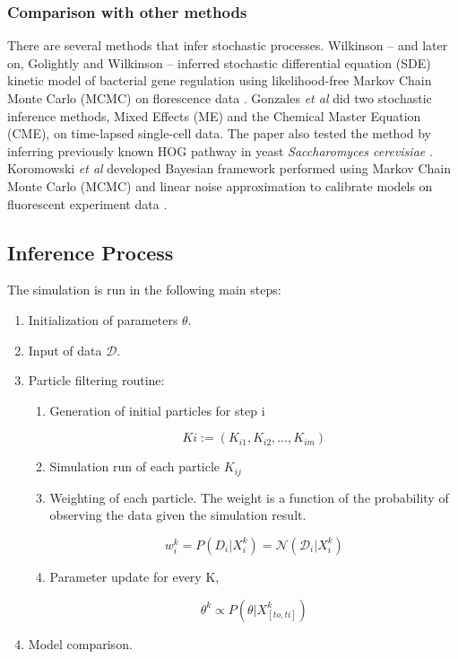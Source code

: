 \documentclass{bioinfo}
\begin{document}
\subsubsection{Comparison with other methods}

There are several methods that infer stochastic processes. Wilkinson -- and later on, Golightly and Wilkinson --  inferred stochastic differential equation (SDE) kinetic model of bacterial gene regulation using likelihood-free Markov Chain Monte Carlo (MCMC) on florescence data \citep{Wilkinson10, GolightlyWilkinson10}. Gonzales \textit{et al} did two stochastic inference methods, Mixed Effects (ME) and the Chemical Master Equation (CME), on time-lapsed single-cell data. The paper also tested the method by inferring previously known HOG pathway in yeast \textit{Saccharomyces cerevisiae} \citep{Gonzales13}. Koromowski \textit{et al} developed Bayesian framework performed using Markov Chain Monte Carlo (MCMC) and linear noise approximation to calibrate models on fluorescent experiment data \citep{Komorowski09}.


\subsection{Inference Process}

The simulation is run in the following main steps:

\begin{enumerate}
\item Initialization of parameters $\theta$.
\item Input of data $\mathcal{D}$.
\item Particle filtering routine:

\begin{enumerate}
\item Generation of initial particles for step i

\begin{equation}
Ki := (K_{i1}, K_{i2}, \dots, K_{im})\label{eq:11}
\end{equation}

\item Simulation run of each particle $K_{ij}$
\item Weighting of each particle. The weight is a function of the probability of observing the data given the simulation result.

\begin{equation}
w_i^k = P(D_i | X_i^k) = \mathcal{N}(\mathcal{D}_i | X_i^k)\label{eq:12}
\end{equation}

\item Parameter update for every K,

\begin{equation}
\theta^k \propto P(\theta | X^k_{[to, ti]})\label{eq:13}
\end{equation}

\end{enumerate}

\item Model comparison.

\end{enumerate}
\end{document}
